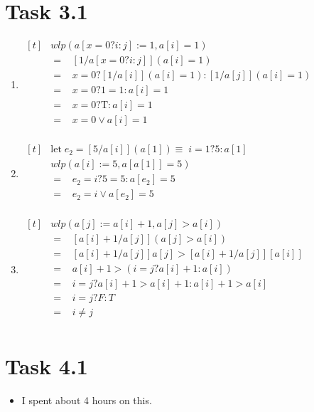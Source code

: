 \documentclass{article}
\newcommand{\answer}{\item[]} %
\begin{document}
	\pagebreak
	
	\section{Task 3.1}
		\begin{enumerate}[label = {(\alph*)}]
			
			\item
			$\begin{aligned}[t]
				&wlp(a[x = 0 ? i : j] := 1, a[i] = 1) \\
				&= \; \; \; [1/a[x = 0 ? i : j]](a[i] = 1)\\
				&= \; \; \; x = 0 ? [1 / a[i]](a[i] = 1) : [1 / a[j]](a[i] = 1)\\
				&= \; \; \; x = 0 ? 1 = 1 : a[i] = 1 \\
				&= \; \; \; x = 0 ? \text{T} : a[i] = 1 \\
				&= \; \; \; x = 0 \lor a[i] = 1 \\
			\end{aligned}$
			
			\item
			$\begin{aligned}[t]
				&\text{let} \; e_{2} = [5/a[i]](a[1]) \equiv \; i = 1 ? 5 : a[1] \\
				&wlp(a[i] := 5, a[a[1]] = 5) \\
				&= \; \; \; e_{2} = i ? 5 = 5 : a[e_{2}] = 5 \\
				&= \; \; \; e_{2} = i \lor a[e_{2}] = 5 \\
			\end{aligned}$
			
			\item
			$\begin{aligned}[t]
				&wlp(a[j] := a[i] + 1, a[j] > a[i]) \\
				&= \; \; \; [a[i] + 1 / a[j]](a[j] > a[i]) \\
				&= \; \; \; [a[i] + 1 / a[j]]a[j] > [a[i] + 1 / a[j]][a[i]] \\
				&= \; \; \; a[i] + 1 > (i = j ? a[i] + 1 : a[i]) \\
				&= \; \; \; i = j ? a[i] + 1 > a[i] + 1 : a[i] + 1 > a[i] \\
				&= \; \; \; i = j ? F : T \\
				&= \; \; \; i \neq j \\
			\end{aligned}$
			
		\end{enumerate}
	
	\section{Task 4.1}
		\begin{itemize}
			
			\answer I spent about 4 hours on this.
			
		\end{itemize}
	
\end{document}
